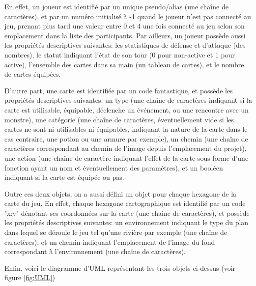 \documentclass[12pt]{report}
\begin{document}
		En effet, un joueur est identifié par un unique pseudo/alias (une chaîne de caractères), et par un numéro initialisé à -1 quand le joueur n'est pas connecté au jeu, prenant plus tard une valeur entre 0 et 4 une fois connecté au jeu selon son emplacement dans la liste des participants. Par ailleurs, un joueur possède aussi les propriétés descriptives suivantes: les statistiques de défense et d'attaque (des nombres), le statut indiquant l'état de son tour (0 pour non-active et 1 pour active), l'ensemble des cartes dans sa main (un tableau de cartes), et le nombre de cartes équipées.

		D'autre part, une carte est identifiée par un code fantastique, et possède les propriétés descriptives suivantes: un type (une chaîne de caractères indiquant si la carte est utilisable, équipable, déclenche un événement, ou une rencontre avec un monstre), une catégorie (une chaîne de caractères, éventuellement vide si les cartes ne sont ni utilisables ni équipables, indiquant la nature de la carte dans le cas contraire, une potion ou une armure par exemple), un chemin (une chaîne de caractères correspondant au chemin de l'image depuis l'emplacement du projet), une action (une chaîne de caractère indiquant l'effet de la carte sous forme d'une fonction ayant un nom et éventuellement des paramètres), et un booléen indiquant si la carte est équipée ou pas.

		Outre ces deux objets, on a aussi défini un objet pour chaque hexagone de la carte du jeu. En effet, chaque hexagone cartographique est identifié par un code "x:y" dénotant ses coordonnées sur la carte (une chaîne de caractères), et possède les propriétés descriptives suivantes: un environnement indiquant le type du plan dans lequel se déroule le jeu tel qu'une rivière par exemple (une chaîne de caractères), et un chemin indiquant l'emplacement de l'image du fond correspondant à l'environnement (une chaîne de caractères).

		Enfin, voici le diagramme d'UML représentant les trois objets ci-dessus (voir figure \ref{fig:UML})
\end{document}
